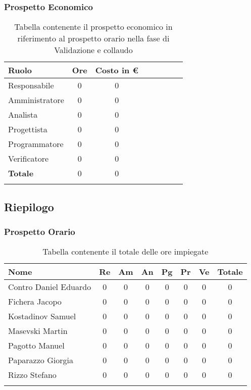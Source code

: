 \documentclass[../piano_di_progetto.tex]{subfiles}
\begin{document}
\subsubsection{Prospetto Economico}

\begin{center}
	\begin{longtable}{|l|c|c|c|c|c|c|c|}
		\hline
		\rowcolor{lightgray}
		\textbf{Ruolo} & \textbf{Ore} & \textbf{Costo in €}\\

		\hline
		Responsabile & 0 & 0\\
		\hline
		Amministratore & 0 & 0\\
		\hline
		Analista & 0 & 0\\
		\hline
		Progettista & 0 & 0\\
		\hline
		Programmatore & 0 & 0\\
		\hline
		Verificatore & 0 & 0\\
		\hline
		\textbf{Totale} & 0 & 0\\
		\hline
		\caption{Tabella contenente il prospetto economico in riferimento al prospetto orario nella fase di Validazione e collaudo}
	\end{longtable}
\end{center}


\subsection{ Riepilogo}%
\label{sub:riepilog}

\subsubsection{Prospetto Orario}

\begin{center}
	\begin{longtable}{|l|c|c|c|c|c|c|c|}
		\hline
		\rowcolor{lightgray}
		\textbf{Nome} & \textbf{Re} & \textbf{Am} & \textbf{An} & \textbf{Pg}  & \textbf{Pr}   & \textbf{Ve} & \textbf{Totale} \\

		\hline
			Contro Daniel Eduardo & 0 &0&0&0&0&0 & 0 \\
		\hline
			Fichera Jacopo &  0 &0&0&0&0&0 & 0 \\
		\hline
			Kostadinov Samuel &  0 &0&0&0&0&0 & 0 \\			
		\hline
			Masevski Martin 	&  0 &0&0&0&0&0 & 0\\
		\hline
			Pagotto Manuel &  0 &0&0&0&0&0 & 0 \\			
		\hline
			Paparazzo Giorgia &  0 &0&0&0&0&0 & 0 \\
		\hline
			Rizzo Stefano &  0 &0&0&0&0&0 & 0\\
		\hline	

		\caption{Tabella contenente il totale delle ore impiegate}
	\end{longtable}
\end{center}
\end{document}
